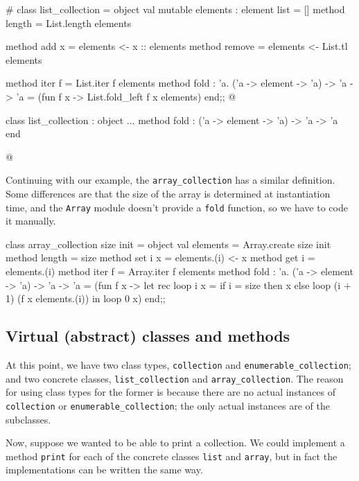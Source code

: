 \begin{ocaml}
# class list_collection =
  object
     val mutable elements : element list = []
     method length = List.length elements

     method add x = elements <- x :: elements
     method remove = elements <- List.tl elements

     method iter f = List.iter f elements
     method fold : 'a. ('a -> element -> 'a) -> 'a -> 'a =
        (fun f x -> List.fold_left f x elements)
  end;;
@
\begin{topoutput}
class list_collection :
object
   ...
   method fold : ('a -> element -> 'a) -> 'a -> 'a
end
\end{topoutput}
@
\end{ocaml}
%
Continuing with our example, the \hbox{\lstinline/array_collection/} has a similar definition.  Some
differences are that the size of the array is determined at instantiation time, and
the \hbox{\lstinline/Array/} module doesn't provide a \hbox{\lstinline/fold/} function, so we have to code it
manually.

\begin{ocaml}
class array_collection size init =
object
   val elements = Array.create size init
   method length = size
   method set i x = elements.(i) <- x
   method get i = elements.(i)
   method iter f = Array.iter f elements
   method fold : 'a. ('a -> element -> 'a) -> 'a -> 'a =
      (fun f x ->
         let rec loop i x =
            if i = size then x else loop (i + 1) (f x elements.(i))
         in
         loop 0 x)
end;;
\end{ocaml}

\subsection{Virtual (abstract) classes and methods}

At this point, we have two class types, \hbox{\lstinline/collection/}
and \hbox{\lstinline/enumerable_collection/}; and two concrete classes, \hbox{\lstinline/list_collection/}
and \hbox{\lstinline/array_collection/}.  The reason for using class types for the former is because there
are no actual instances of \hbox{\lstinline/collection/} or \hbox{\lstinline/enumerable_collection/}; the only
actual instances are of the subclasses.

Now, suppose we wanted to be able to print a collection.  We could implement a
method \hbox{\lstinline/print/} for each of the concrete classes \hbox{\lstinline/list/} and \hbox{\lstinline/array/},
but in fact the implementations can be written the same way.

